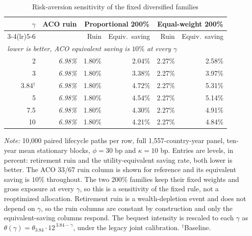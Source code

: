\begin{table}[H]
\centering
\caption{Risk-aversion sensitivity of the fixed diversified families}
\label{tab:gamma-sensitivity}
\small\setlength{\tabcolsep}{4pt}
\begin{tabular}{rrrrrr}
\toprule
$\gamma$ & ACO ruin & \multicolumn{2}{c}{Proportional 200\%} & \multicolumn{2}{c}{Equal-weight 200\%} \\
\cmidrule(lr){3-4}\cmidrule(lr){5-6}
 & & Ruin & Equiv.\ saving & Ruin & Equiv.\ saving \\
\multicolumn{6}{l}{\footnotesize\emph{lower is better, ACO equivalent saving is $10\%$ at every $\gamma$}} \\
\midrule
2 & \emph{6.98\%} & 1.80\% & 2.04\% & 2.27\% & 2.58\% \\
3 & \emph{6.98\%} & 1.80\% & 3.38\% & 2.27\% & 3.97\% \\
3.84$^{\dagger}$ & \emph{6.98\%} & 1.80\% & 4.72\% & 2.27\% & 5.31\% \\
5 & \emph{6.98\%} & 1.80\% & 4.54\% & 2.27\% & 5.14\% \\
7.5 & \emph{6.98\%} & 1.80\% & 4.30\% & 2.27\% & 4.91\% \\
10 & \emph{6.98\%} & 1.80\% & 4.21\% & 2.27\% & 4.84\% \\
\bottomrule
\end{tabular}
\begin{minipage}{0.95\textwidth}\footnotesize
\textit{Note:} 10{,}000 paired lifecycle paths per row, full 1{,}557-country-year panel, ten-year mean stationary blocks, $\phi=30$ bp and $\kappa=10$ bp. Entries are levels, in percent: retirement ruin and the utility-equivalent saving rate, both lower is better. The ACO 33/67 ruin column is shown for reference and its equivalent saving is $10\%$ throughout. The two 200\% families keep their fixed weights and gross exposure at every $\gamma$, so this is a sensitivity of the fixed rule, not a reoptimized allocation. Retirement ruin is a wealth-depletion event and does not depend on $\gamma$, so the ruin columns are constant by construction and only the equivalent-saving columns respond. The bequest intensity is rescaled to each $\gamma$ as $\theta(\gamma)=\theta_{3.84}\cdot 12^{\,3.84-\gamma}$, under the legacy joint calibration. $^{\dagger}$Baseline.
\end{minipage}
\end{table}
